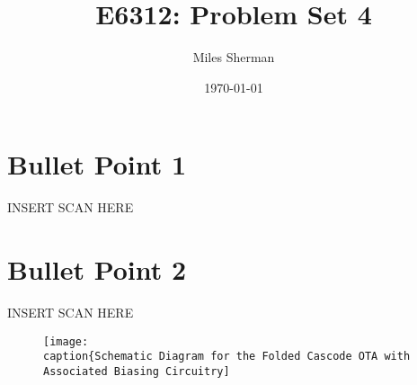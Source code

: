 \documentclass{article}
\begin{document}
\title{E6312: Problem Set 4}
\author{Miles Sherman}
\date{\today}
\maketitle

\section{Bullet Point 1}
INSERT SCAN HERE

\section{Bullet Point 2}
INSERT SCAN HERE

\begin{figure}[H]
\centering
\texttt{[image: 
\\caption\{Schematic Diagram for the Folded Cascode OTA with Associated Biasing Circuitry]}
\label{b2_schem}
\end{figure}
\end{document}
